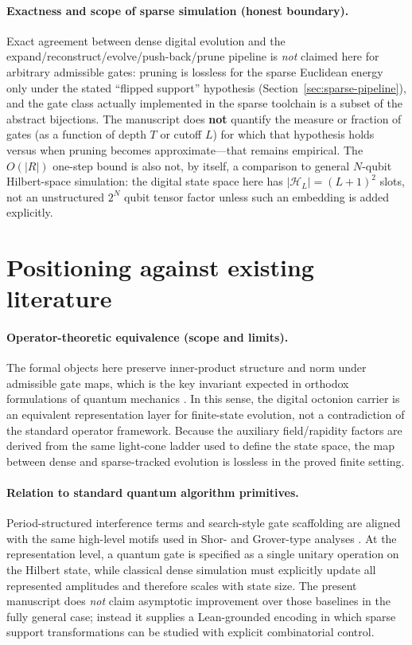 \documentclass[11pt,a4paper]{article}
\theoremstyle{remark}
\begin{document}
\paragraph{Exactness and scope of sparse simulation (honest boundary).}
Exact agreement between dense digital evolution and the expand/reconstruct/evolve/push-back/prune pipeline is \emph{not} claimed here for arbitrary admissible gates: pruning is lossless for the sparse Euclidean energy only under the stated ``flipped support'' hypothesis (Section~\ref{sec:sparse-pipeline}), and the gate class actually implemented in the sparse toolchain is a subset of the abstract bijections. The manuscript does \textbf{not} quantify the measure or fraction of gates (as a function of depth $T$ or cutoff $L$) for which that hypothesis holds versus when pruning becomes approximate---that remains empirical. The $O(|R|)$ one-step bound is also not, by itself, a comparison to general $N$-qubit Hilbert-space simulation: the digital state space here has $|\mathcal{H}_L|=(L+1)^2$ slots, not an unstructured $2^N$ qubit tensor factor unless such an embedding is added explicitly.

\section{Positioning against existing literature}

\paragraph{Operator-theoretic equivalence (scope and limits).}
The formal objects here preserve inner-product structure and norm under admissible gate maps, which is the key invariant expected in orthodox formulations of quantum mechanics \cite{vonNeumann1955,dirac1930}. In this sense, the digital octonion carrier is an equivalent representation layer for finite-state evolution, not a contradiction of the standard operator framework. Because the auxiliary field/rapidity factors are derived from the same light-cone ladder used to define the state space, the map between dense and sparse-tracked evolution is lossless in the proved finite setting.

\paragraph{Relation to standard quantum algorithm primitives.}
Period-structured interference terms and search-style gate scaffolding are aligned with the same high-level motifs used in Shor- and Grover-type analyses \cite{shor1997,grover1996}. At the representation level, a quantum gate is specified as a single unitary operation on the Hilbert state, while classical dense simulation must explicitly update all represented amplitudes and therefore scales with state size. The present manuscript does \emph{not} claim asymptotic improvement over those baselines in the fully general case; instead it supplies a Lean-grounded encoding in which sparse support transformations can be studied with explicit combinatorial control.
\end{document}
